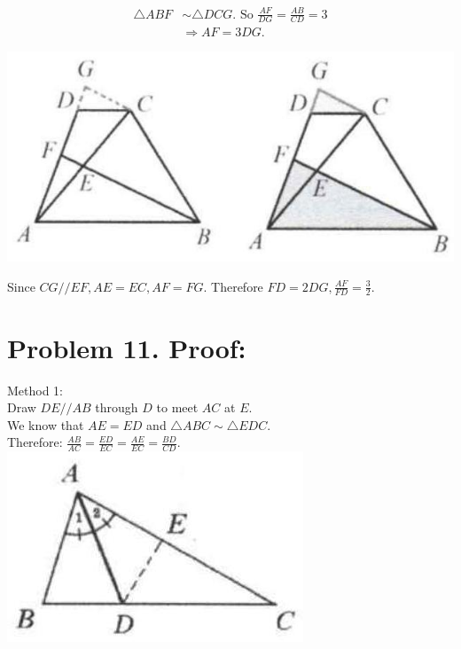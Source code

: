 \documentclass[10pt]{article}
\begin{document}
\[
\begin{aligned}
\triangle A B F & \sim \triangle D C G . \text { So } \frac{A F}{D G}=\frac{A B}{C D}=3 \\
& \Rightarrow A F=3 D G .
\end{aligned}
\]

\begin{center}
\includegraphics[max width=\textwidth]{2025_04_17_97bc1f7e44d93c271a88g-136(3)}
\end{center}

Since \(C G / / E F, A E=E C, A F=F G\). Therefore \(F D=2 D G, \frac{A F}{F D}=\frac{3}{2}\).

\section*{Problem 11. Proof:}
Method 1:\\
Draw \(D E / / A B\) through \(D\) to meet \(A C\) at \(E\).\\
We know that \(A E=E D\) and \(\triangle A B C \sim \triangle E D C\).\\
Therefore: \(\frac{A B}{A C}=\frac{E D}{E C}=\frac{A E}{E C}=\frac{B D}{C D}\).\\
\includegraphics[max width=\textwidth, center]{2025_04_17_97bc1f7e44d93c271a88g-136(2)}
\end{document}
